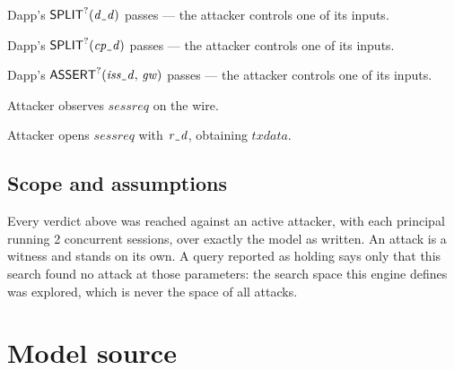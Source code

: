 \documentclass[11pt]{article}
\newcommand{\vpus}{\kern0.06em\rule[-0.22ex]{0.34em}{0.045em}\kern0.06em}
\newcommand{\vpprimo}[1]{\mathsf{#1}}
\newcommand{\vpconst}[1]{\mathit{#1}}
\newcommand{\vpchecked}{^{?}}
\newcommand{\vpsep}{\allowbreak\,}
\newcommand{\vpterm}[1]{\ensuremath{#1}}
\newcommand{\vpactor}[1]{\textsf{#1}}
\begin{document}
\begin{vptrace}
\item \vpactor{Dapp}'s \vpterm{\vpprimo{SPLIT}\vpchecked{}(\vpconst{d\vpus d})} passes --- the attacker controls one of its inputs.
\item \vpactor{Dapp}'s \vpterm{\vpprimo{SPLIT}\vpchecked{}(\vpconst{cp\vpus d})} passes --- the attacker controls one of its inputs.
\item \vpactor{Dapp}'s \vpterm{\vpprimo{ASSERT}\vpchecked{}(\vpconst{iss\vpus d},\vpsep \vpconst{gw})} passes --- the attacker controls one of its inputs.
\item \vpactor{Attacker} observes \vpterm{\vpconst{sessreq}} on the wire.
\item \vpactor{Attacker} opens \vpterm{\vpconst{sessreq}} with \vpterm{\vpconst{r\vpus d}}, obtaining \vpterm{\vpconst{txdata}}.
\end{vptrace}



\subsection{Scope and assumptions}
\noindent Every verdict above was reached against an active attacker, with each principal running 2 concurrent sessions, over exactly the model as written. An attack is a witness and stands on its own. A query reported as holding says only that this search found no attack at those parameters: the search space this engine defines was explored, which is never the space of all attacks.




\appendix
\section{Model source}
\end{document}
